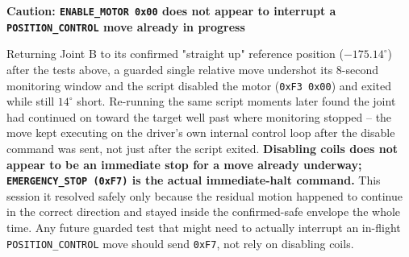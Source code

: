 \documentclass[11pt,letterpaper]{article}
\newenvironment{caution}[1]{%
    \par\addvspace{8pt}%
    \noindent{\color{cautionred}\rule{\linewidth}{0.8pt}}\par\vspace{2pt}
    \noindent\textbf{\color{cautionred}Caution: #1}\par\vspace{2pt}
}{%
    \par\vspace{2pt}\noindent{\color{cautionred}\rule{\linewidth}{0.4pt}}%
    \par\addvspace{8pt}%
}
\begin{document}
\begin{caution}{\texttt{ENABLE\_MOTOR 0x00} does not appear to interrupt a \texttt{POSITION\_CONTROL} move already in progress}
Returning Joint B to its confirmed "straight up" reference position ($-175.14^\circ$) after the tests above, a guarded single relative move undershot its 8-second monitoring window and the script disabled the motor (\texttt{0xF3 0x00}) and exited while still $14^\circ$ short. Re-running the same script moments later found the joint had continued on toward the target well past where monitoring stopped -- the move kept executing on the driver's own internal control loop after the disable command was sent, not just after the script exited. \textbf{Disabling coils does not appear to be an immediate stop for a move already underway; \texttt{EMERGENCY\_STOP (0xF7)} is the actual immediate-halt command.} This session it resolved safely only because the residual motion happened to continue in the correct direction and stayed inside the confirmed-safe envelope the whole time. Any future guarded test that might need to actually interrupt an in-flight \texttt{POSITION\_CONTROL} move should send \texttt{0xF7}, not rely on disabling coils.
\end{caution}
\end{document}

